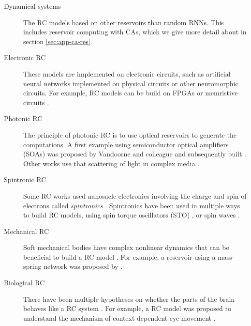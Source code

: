 \begin{description}
  \item[Dynamical systems] The \ac{RC} models based on other reservoirs than
        random \acp{RNN}. This includes reservoir computing with \aclp{CA},
        which we give more detail about in section \ref{sec:app-ca-res}.
  \item[Electronic \ac{RC}] These models are implemented on electronic circuits,
        such as artificial neural networks implemented on physical circuits or
        other neuromorphic circuits. For example, \ac{RC} models can be build on
        FPGAs \parencite{antonikApplicationFPGAReal2018,
        verstraetenReservoirComputingStochastic2005,
        alomarLowcostHardwareImplementation2014,
        antonikFPGAImplementationReservoir2015} or memristive circuits
        \parencite{yangInvestigationsStaircaseMemristor2016,
        merkelMemristiveReservoirComputing2014,
        donahueDesignAnalysisNeuromemristive2015}.
  \item[Photonic \ac{RC}] The principle of photonic \ac{RC} is to use optical
        reservoirs to generate the computations. A first example using
        semiconductor optical amplifiers (SOAs) was proposed by
        Vandoorne and colleague \parencite{vandoorneOpticalSignalProcessing2008,
        vandoorneParallelReservoirComputing2011} and subsequently built \parencite{vandoorneExperimentalDemonstrationReservoir2014}.
        Other works use that scattering of light in complex media
        \parencite{dongOpticalReservoirComputing2020,
        rafayelyanLargeScaleOpticalReservoir2020}.
  \item[Spintronic \ac{RC}] Some \ac{RC} works used nanosacle electronics
        involving the charge and spin of electrons called \emph{spintronics}
        \parencite{wolfSpintronicsSpinBasedElectronics2001}. Spintronics have
        been used in multiple ways to build \ac{RC} models, using spin torque
        oscillators (STO)
        \parencite{torrejonNeuromorphicComputingNanoscale2017,
        williameChaoticDynamicsMacrospin2019}, or spin waves
        \parencite{nakaneReservoirComputingSpin2018}.
  \item[Mechanical \ac{RC}] Soft mechanical bodies have complex nonlinear
        dynamics that can be beneficial to build a \ac{RC} model
        \parencite{pfeiferHowBodyShapes2007}. For example, a reservoir using a
        mass-spring network was proposed by
        \textcite{hauserTheoreticalFoundationMorphological2011}.
  \item[Biological \ac{RC}] There have been multiple hypotheses on whether the
        parts of the brain behaves like a \ac{RC} system
        \parencite{yamazakiCerebellumLiquidState2007}. For example, a \ac{RC}
        model was proposed to understand the mechanism of context-dependent eye
        movement \parencite{domineyComplexSensorymotorSequence1995,
        domineyModelCorticostriatalPlasticity1995}.
\end{description}

